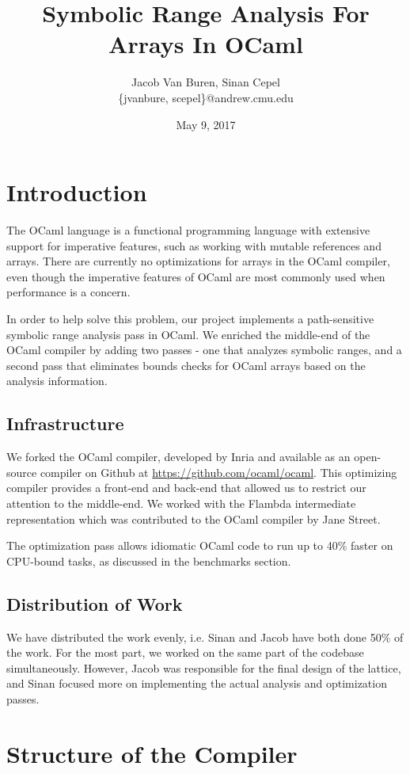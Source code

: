 \documentclass[11pt]{article}
\title{Symbolic Range Analysis For Arrays In OCaml}
\date{May 9, 2017}
\author{Jacob Van Buren, Sinan Cepel \\ \{jvanbure, scepel\}@andrew.cmu.edu}
\begin{document}
\maketitle

\section{Introduction}

The OCaml language is a functional programming language with extensive support for imperative features, such as working with mutable references and arrays. There are currently no optimizations for arrays in the OCaml compiler, even though the imperative features of OCaml are most commonly used when performance is a concern.

In order to help solve this problem, our project implements a path-sensitive symbolic range analysis pass in OCaml. We enriched the middle-end of the OCaml compiler by adding two passes - one that analyzes symbolic ranges, and a second pass that eliminates bounds checks for OCaml arrays based on the analysis information.

\subsection{Infrastructure}

We forked the OCaml compiler, developed by Inria and available as an open-source compiler on Github at \url{https://github.com/ocaml/ocaml}. This optimizing compiler provides a front-end and back-end that allowed us to restrict our attention to the middle-end. We worked with the Flambda intermediate representation which was contributed to the OCaml compiler by Jane Street.

The optimization pass allows idiomatic OCaml code to run up to 40\% faster on CPU-bound tasks, as discussed in the benchmarks section. 

\subsection{Distribution of Work}

We have distributed the work evenly, i.e. Sinan and Jacob have both done 50\% of the work. For the most part, we worked on the same part of the codebase simultaneously. However, Jacob was responsible for the final design of the lattice, and Sinan focused more on implementing the actual analysis and optimization passes.

\section{Structure of the Compiler}
\end{document}

